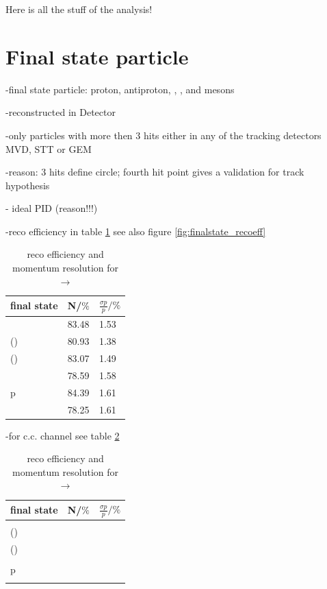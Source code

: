 Here is all the stuff of the analysis!

\section{Final state particle}
	-final state particle: proton, antiproton, \piminus, \piplus, \kminus and \kplus mesons
	
	-reconstructed in Detector
	
	-only particles with more then 3 hits either in any of the tracking detectors MVD, STT or GEM 
	
	-reason: 3 hits define circle; fourth hit point gives a validation for track hypothesis
	
	- ideal PID (reason!!!)
	
	-reco efficiency in table \ref{tab:finalstate_recoeff} see also figure \ref{fig:finalstate_recoeff}
	
	\begin{table}
		\centering
		\caption{reco efficiency and momentum resolution for \pbarpSystem $\rightarrow$ \excitedcascade \anticascade}
		\label{tab:finalstate_recoeff}
		\begin{tabular}{lll}
			\hline
			final state & N/$\%$ & $\frac{\sigma p}{p}/\%$ \\
			\hline
			\hline
			\piminus & 83.48 & 1.53\\
			\piplusone(\anticascade) &  80.93& 1.38 \\
			\piplustwo(\alam) &  83.07& 1.49\\
			\kminus&  78.59& 1.58\\
			p &  84.39& 1.61\\
			\antiproton & 78.25 & 1.61\\\hline
			 
		\end{tabular}
	\end{table}
	
	-for c.c. channel see table \ref{tab:finalstate_recoeff_cc}
	
	\begin{table}
		\centering
		\caption{reco efficiency and momentum resolution for \pbarpSystem $\rightarrow$ \excitedanticascade \cascade}
		\label{tab:finalstate_recoeff_cc}
		\begin{tabular}{lll}
			\hline
			final state & N/$\%$ & $\frac{\sigma p}{p}/\%$ \\
			\hline
			\hline
			\piplus &  & \\
			\piminusone(\cascade) &  &  \\
			\piminustwo(\lam) &  & \\
			\kplus&  & \\
			p &  &\\
			\antiproton &  &\\\hline
			 
		\end{tabular}
	\end{table}
	
